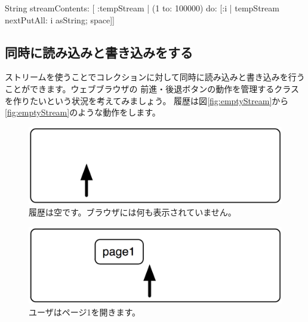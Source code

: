 \documentclass[a4paper,10pt,twoside]{book}
\begin{document}
{\begin{code}{}
String streamContents: [ :tempStream |
  (1 to: 100000)
       do: [:i | tempStream nextPutAll: i asString; space]] 
\end{code}

\subsection{同時に読み込みと書き込みをする}

ストリームを使うことでコレクションに対して同時に読み込みと書き込みを行うことができます。ウェブブラウザの
前進・後退ボタンの動作を管理するクラスを作りたいという状況を考えてみましょう。
履歴は図\ref{fig:emptyStream}から\ref{fig:emptyStream}のような動作をします。


\begin{figure}[!ht]
\centerline{\includegraphics[scale=0.5]{emptyStef}}
\caption{履歴は空です。ブラウザには何も表示されていません。}
\vspace{.2in}
\end{figure}

\begin{figure}[!ht]
\centerline{\includegraphics[scale=0.5]{page1Stef}}
\caption{ユーザはページ1を開きます。}
\vspace{.2in}
\end{figure}

}
\end{document}

